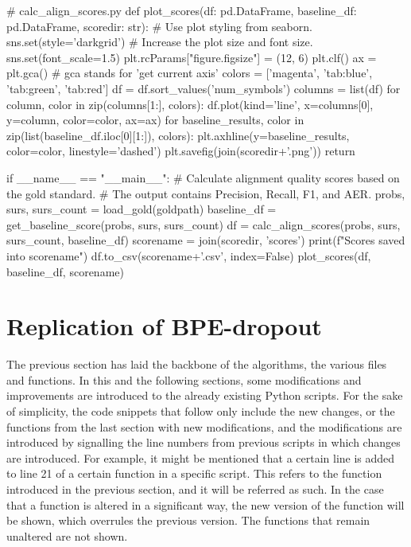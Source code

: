 \begin{python}
# calc_align_scores.py
def plot_scores(df: pd.DataFrame, baseline_df: pd.DataFrame, scoredir: str):
  # Use plot styling from seaborn.
  sns.set(style='darkgrid')
  # Increase the plot size and font size.
  sns.set(font_scale=1.5)
  plt.rcParams["figure.figsize"] = (12, 6)
  plt.clf()
  ax = plt.gca() # gca stands for 'get current axis'
  colors = ['magenta', 'tab:blue', 'tab:green', 'tab:red']
  df = df.sort_values('num_symbols')
  columns = list(df)
  for column, color in zip(columns[1:], colors):
    df.plot(kind='line', x=columns[0], y=column, color=color, ax=ax)
  for baseline_results, color in zip(list(baseline_df.iloc[0][1:]), colors):
    plt.axhline(y=baseline_results, color=color, linestyle='dashed')
  plt.savefig(join(scoredir+'.png'))
  return


if __name__ == "__main__":
  # Calculate alignment quality scores based on the gold standard.
  # The output contains Precision, Recall, F1, and AER.
  probs, surs, surs_count = load_gold(goldpath)
  baseline_df = get_baseline_score(probs, surs, surs_count)
  df = calc_align_scores(probs, surs, surs_count, baseline_df)
  scorename = join(scoredir, 'scores')
  print(f"Scores saved into {scorename}")
  df.to_csv(scorename+'.csv', index=False)
  plot_scores(df, baseline_df, scorename)
\end{python}

\section{Replication of BPE-dropout}

The previous section has laid the backbone of the algorithms, the various files and functions. In this and the following sections, some modifications and improvements are introduced to the already existing Python scripts. For the sake of simplicity, the code snippets that follow only include the new changes, or the functions from the last section with new modifications, and the modifications are introduced by signalling the line numbers from previous scripts in which changes are introduced. For example, it might be mentioned that a certain line is added to line 21 of a certain function in a specific script. This refers to the function introduced in the previous section, and it will be referred as such. In the case that a function is altered in a significant way, the new version of the function will be shown, which overrules the previous version. The functions that remain unaltered are not shown.

